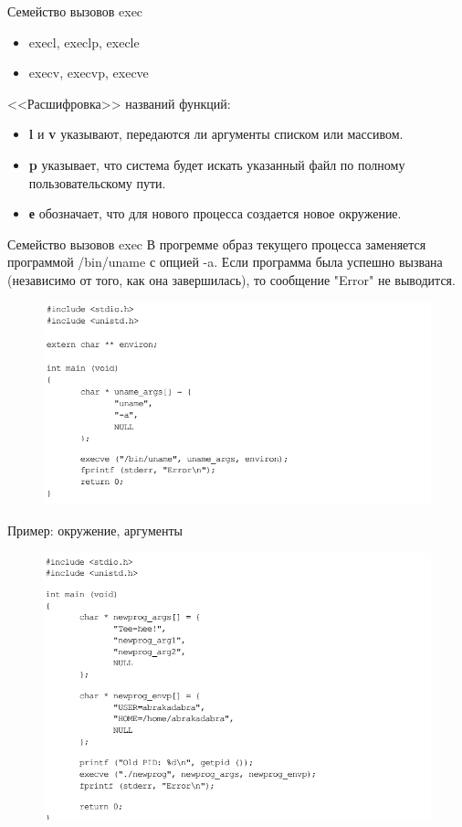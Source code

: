 \documentclass[xcolor=table]{beamer}
\begin{document}
\begin{frame}{Семейство вызовов exec}
\begin{itemize}
\item execl, execlp, execle  
\item execv, execvp, execve
\end{itemize}
<<Расшифровка>> названий функций:
\begin{itemize}
\item \textbf{l} и \textbf{v} указывают, передаются ли аргументы списком или массивом. 
\item \textbf{p} указывает, что система будет искать указанный файл по
полному пользовательскому пути. 
\item \textbf{е} обозначает, что для нового процесса создается новое окружение.
\end{itemize}
\end{frame}

\begin{frame}{Семейство вызовов exec}
В прогремме образ текущего процесса заменяется программой
/bin/uname с опцией -a. Если программа была успешно вызвана (независимо от того,
как она завершилась), то сообщение "Error" не выводится. 
\begin{figure}[h]
\centering
\includegraphics[scale=0.5]{images/lec07-pic36.png}
\end{figure}
\end{frame}

\begin{frame}{Пример: окружение, аргументы}
\begin{figure}[h]
\centering
\includegraphics[scale=0.5]{images/lec07-pic37.png}
\end{figure}
\end{frame}
\end{document}
